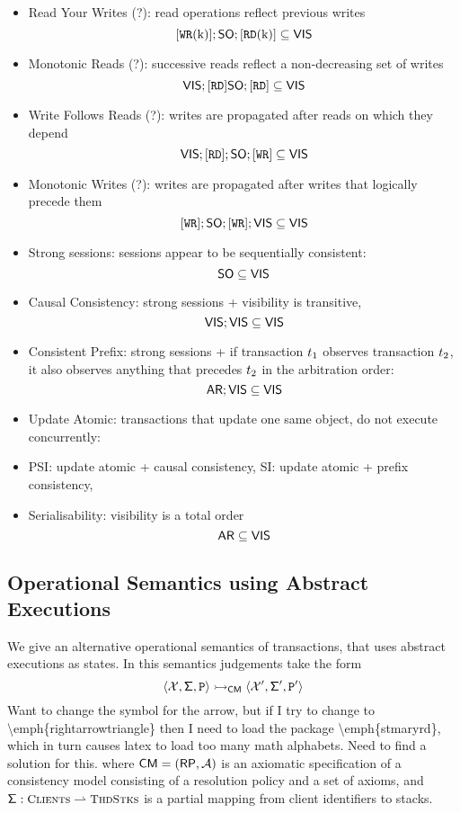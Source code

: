 \begin{itemize}
\item Read Your Writes (?): read operations reflect previous writes
\[
[{{\tt WR}}(\mathrm{k})] ; {\sf{SO}} ; [{{\tt RD}}(\mathrm{k})] \subseteq {\mathsf{VIS}}
\]
\item Monotonic Reads (?): successive reads reflect a non-decreasing set of writes
\[
{\mathsf{VIS}}; [{{\tt RD}}] {\sf{SO}} ; [{{\tt RD}}] \subseteq {\mathsf{VIS}}
\]
\item Write Follows Reads (?): writes are propagated after reads on which they depend 
\[
{\mathsf{VIS}}; [{{\tt RD}}]; {\sf{SO}}; [{{\tt WR}}] \subseteq {\mathsf{VIS}} 
\]
\item Monotonic Writes (?): writes are propagated after writes that logically precede them 
\[ 
[{{\tt WR}}]; {\sf{SO}}; [{{\tt WR}}]; {\mathsf{VIS}} \subseteq {\mathsf{VIS}} 
\]
\item Strong sessions: sessions appear to be sequentially consistent: 
\[ 
{\sf{SO}} \subseteq {\mathsf{VIS}} 
\]
\item Causal Consistency: strong sessions + visibility is transitive, 
\[ 
{\mathsf{VIS}} ; {\mathsf{VIS}} \subseteq {\mathsf{VIS}}
\]
\item Consistent Prefix: strong sessions + if transaction $t_1$ observes transaction $t_2$, it also observes 
anything that precedes $t_2$ in the arbitration order: 
\[
{\sf{AR}} ; {\mathsf{VIS}} \subseteq {\mathsf{VIS}}
\]
\item Update Atomic: transactions that update one same object, do not execute concurrently: 
\item PSI: update atomic + causal consistency, SI: update atomic + prefix consistency, 
\item Serialisability: visibility is a total order 
\[
{\sf{AR}} \subseteq {\mathsf{VIS}} 
\]
\end{itemize}


\subsection{Operational Semantics using Abstract Executions}
We give an alternative operational semantics of transactions, that uses abstract executions as states. 
In this semantics judgements take the form 
\[
\langle \mathcal{X}, \mathsf{\Sigma}, \texttt{P} \rangle \rightarrowtail_{\mathsf{CM}} \langle \mathcal{X}', \mathsf{\Sigma}', \texttt{P}' \rangle
\]
\ac{Want to change the symbol for the arrow, but if I try to change to \emph{rightarrowtriangle} then 
I need to load the package \emph{stmaryrd}, which in turn causes latex to load too many math alphabets. 
Need to find a solution for this.}
where $\mathsf{CM} = (\mathsf{RP}, \mathcal{A})$ is an axiomatic specification of a consistency model
consisting of a resolution policy and a set of axioms, and $\thdstackFun: \tidset \rightharpoonup \ThdStacks$ 
is a partial mapping from client identifiers to stacks.

